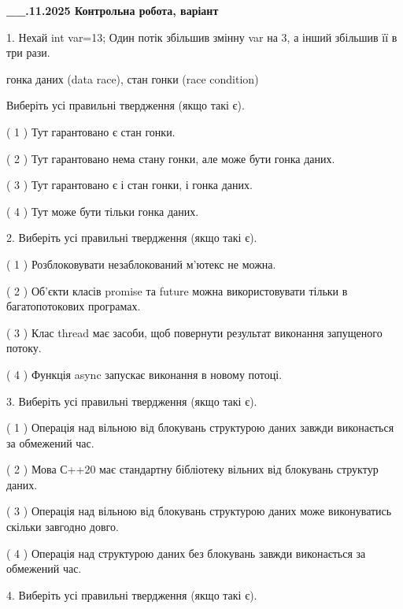 \documentclass[12pt, ukrainian]{article}
\begin{document}
\newpage
\begin {large}

\textbf{\_\_.11.2025 Контрольна робота, варіант  }\par


{
1. Нехай int var=13; Один потік збільшив змінну var на 3, а інший збільшив її в три рази.

гонка даних (data race), стан гонки (race condition)

Виберіть усі правильні твердження (якщо такі є).\par
\vspace{2mm}
( 1 ) Тут гарантовано є стан гонки.%

( 2 ) Тут гарантовано нема стану гонки, але може бути гонка даних.%

( 3 ) Тут гарантовано є і стан гонки, і гонка даних.%

( 4 ) Тут може бути тільки гонка даних.%


2. Виберіть усі правильні твердження (якщо такі є).\par
\vspace{2mm}

( 1 ) Розблоковувати незаблокований м’ютекс не можна.%

( 2 ) Об’єкти класів promise та future можна використовувати тільки в багатопотокових програмах.%

( 3 ) Клас thread має засоби, щоб повернути результат виконання запущеного потоку.%

( 4 ) Функція async запускає виконання в новому потоці.%


3. Виберіть усі правильні твердження (якщо такі є).\par
\vspace{2mm}

( 1 ) Операція над вільною від блокувань структурою даних завжди виконається за обмежений час.%

( 2 ) Мова С++20 має стандартну бібліотеку вільних від блокувань структур даних.%

( 3 ) Операція над вільною від блокувань структурою даних може виконуватись скільки завгодно довго.%

( 4 ) Операція над структурою даних без блокувань завжди виконається за обмежений час.%


4. Виберіть усі правильні твердження (якщо такі є).\par
\vspace{2mm}

}
\end{large}
\end{document}

